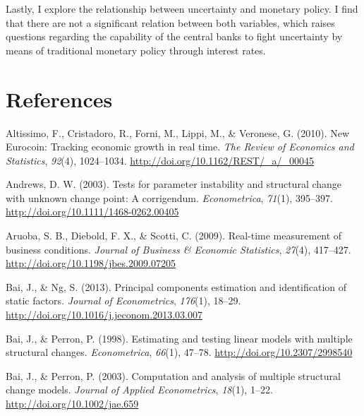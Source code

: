 \documentclass[12pt,twoside]{reedthesis}
\begin{document}
Lastly, I explore the relationship between uncertainty and monetary policy. I find that there are not a significant relation between both variables, which raises questions regarding the capability of the central banks to fight uncertainty by means of traditional monetary policy through interest rates.

\backmatter

\hypertarget{references}{%
\chapter*{References}\label{references}}


\noindent

\setlength{\parindent}{-0.20in}
\setlength{\leftskip}{0.20in}
\setlength{\parskip}{8pt}

\hypertarget{refs}{}
\leavevmode\hypertarget{ref-alticrisfornlippvero:2010}{}%
Altissimo, F., Cristadoro, R., Forni, M., Lippi, M., \& Veronese, G. (2010). New Eurocoin: Tracking economic growth in real time. \emph{The Review of Economics and Statistics}, \emph{92}(4), 1024--1034. \url{http://doi.org/10.1162/REST/_a/_00045}

\leavevmode\hypertarget{ref-andrews:2003}{}%
Andrews, D. W. (2003). Tests for parameter instability and structural change with unknown change point: A corrigendum. \emph{Econometrica}, \emph{71}(1), 395--397. \url{http://doi.org/10.1111/1468-0262.00405}

\leavevmode\hypertarget{ref-aruodiebscot:2009}{}%
Aruoba, S. B., Diebold, F. X., \& Scotti, C. (2009). Real-time measurement of business conditions. \emph{Journal of Business \& Economic Statistics}, \emph{27}(4), 417--427. \url{http://doi.org/10.1198/jbes.2009.07205}

\leavevmode\hypertarget{ref-baing:2013}{}%
Bai, J., \& Ng, S. (2013). Principal components estimation and identification of static factors. \emph{Journal of Econometrics}, \emph{176}(1), 18--29. \url{http://doi.org/10.1016/j.jeconom.2013.03.007}

\leavevmode\hypertarget{ref-baiperr:1998}{}%
Bai, J., \& Perron, P. (1998). Estimating and testing linear models with multiple structural changes. \emph{Econometrica}, \emph{66}(1), 47--78. \url{http://doi.org/10.2307/2998540}

\leavevmode\hypertarget{ref-baiperr:2003}{}%
Bai, J., \& Perron, P. (2003). Computation and analysis of multiple structural change models. \emph{Journal of Applied Econometrics}, \emph{18}(1), 1--22. \url{http://doi.org/10.1002/jae.659}
\end{document}
